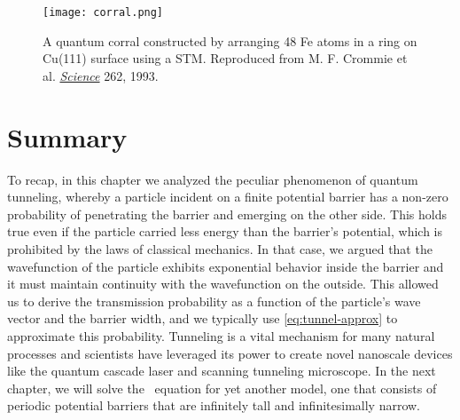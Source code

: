 \begin{figure}[!h]
	\centering
	\texttt{[image: corral.png]}
	\caption{A quantum corral constructed by arranging 48 Fe atoms in a ring on Cu(111) surface using a STM. 
	Reproduced from M. F. Crommie et al. \href{http://science.sciencemag.org/content/262/5131/218}{\emph{Science}} 262, 1993.}
	\label{fig:corral}
\end{figure}


\section{Summary}

To recap, in this chapter we analyzed the peculiar phenomenon of quantum tunneling, whereby a particle incident on a finite potential barrier has a non-zero probability of penetrating the barrier and emerging on the other side. 
This holds true even if the particle carried less energy than the barrier's potential, which is prohibited by the laws of classical mechanics. 
In that case, we argued that the wavefunction of the particle exhibits exponential behavior inside the barrier and it must maintain continuity with the wavefunction on the outside. 
This allowed us to derive the transmission probability as a function of the particle's wave vector and the barrier width, and we typically use \autoref{eq:tunnel-approx} to approximate this probability. 
Tunneling is a vital mechanism for many natural processes and scientists have leveraged its power to create novel nanoscale devices like the quantum cascade laser and scanning tunneling microscope. 
In the next chapter, we will solve the \Sch\ equation for yet another model, one that consists of periodic potential barriers that are infinitely tall and infinitesimally narrow.

%